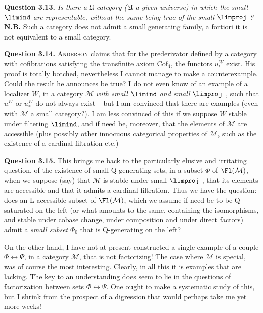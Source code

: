 \marginpar{! \textbar}\textbf{Question 3.13.} \textit{Is there a $\mathfrak{U}$-category (\,$\mathfrak{U}$ a given universe) in which the small $\limind$ are representable, without the same being true of the small $\limproj$ ?} \textbf{N.B.} Such a category does not admit a small generating family, a fortiori it is not equivalent to a small category.

\textbf{Question 3.14.} \textsc{Anderson} claims that for the prederivator defined by a category with cofibrations satisfying the transfinite axiom Cof$_4$, the functors $u_!^W$ exist. His proof is totally botched, nevertheless I cannot manage to make a counterexample. Could the result he announces be true? I do not even know of an example of a localizer $W$, in a category $\mathcal{M}$ \textit{with small $\limind$ and small $\limproj$ ,} such that $u_!^W$ or $u_*^W$ do not always exist -- but I am convinced that there are examples (even with $\mathcal{M}$ a small category?). I am less convinced of this if we suppose $W$ stable under filtering $\limind$, and if need be, moreover, that the elements of $\mathcal{M}$ are accessible (plus possibly other innocuous categorical properties of $\mathcal{M}$, such as the existence of a cardinal
filtration etc.)

\textbf{Question 3.15.} This brings me back to the particularly elusive and irritating question, of the existence of small Q-generating sets, in a subset $\Phi$ of $\Fl(\mathcal{M})$, when we suppose (say) that $\mathcal{M}$ is stable under small $\limproj$ , that its elements are accessible and that it admits a cardinal filtration. Thus we have the question: does an L-accessible subset of $\Fl(\mathcal{M})$, which we assume if need be to be Q-saturated on the left (or what amounts to the same, containing the isomorphisms, and stable under cobase change, under composition and under direct factors) admit a \textit{small subset} $\Phi_0$ that is Q-generating on the left? %

\marginpar{! \textbar}On the other hand, I have not at present constructed a single example of a couple $\Phi \longleftrightarrow \Psi$, in a category $\mathcal{M}$, that is not factorizing! The case where $\mathcal{M}$ is special, was of course the most interesting. Clearly, in all
this it is examples that are lacking. The key to an understanding does seem to lie in the questions of factorization between sets $\Phi \longleftrightarrow \Psi$. One ought to make a systematic study of this, but I shrink from the prospect of a digression that would perhaps take me yet more weeks! %